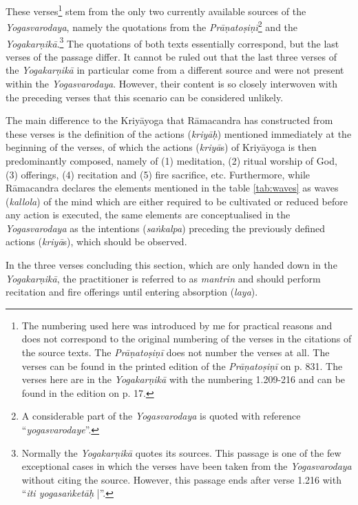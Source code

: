 These verses\footnote{The numbering used here was introduced by me for practical reasons and does not correspond to the original numbering of the verses in the citations of the source texts. The \textit{Prāṇatoṣiṇī} does not number the verses at all. The verses can be found in the printed edition of the \textit{Prāṇatoṣiṇī} on p. 831. The verses here are in the \textit{Yogakarṇikā} with the numbering 1.209-216 and can be found in the edition on p. 17.} stem from the only two currently available sources of the \textit{Yogasvarodaya}, namely the quotations from the \textit{Prāṇatoṣiṇī}\footnote{A considerable part of the \textit{Yogasvarodaya} is quoted with reference ``\textit{yogasvarodaye}''.} and the \textit{Yogakarṇikā}.\footnote{Normally the \textit{Yogakarṇikā} quotes its sources. This passage is one of the few exceptional cases in which the verses have been taken from the \textit{Yogasvarodaya} without citing the source. However, this passage ends after verse 1.216 with ``\textit{iti yogasaṅketāḥ} |''.} The quotations of both texts essentially correspond, but the last verses of the passage differ. It cannot be ruled out that the last three verses of the \textit{Yogakarṇikā} in particular come from a different source and were not present within the \textit{Yogasvarodaya}. However, their content is so closely interwoven with the preceding verses that this scenario can be considered unlikely.

The main difference to the Kriyāyoga that Rāmacandra has constructed from these verses is the definition of the actions (\textit{kriyāḥ}) mentioned immediately at the beginning of the verses, of which the actions (\textit{kriyā}s) of Kriyāyoga is then predominantly composed, namely of (1) meditation, (2) ritual worship of God, (3) offerings, (4) recitation and (5) fire sacrifice, etc. Furthermore, while Rāmacandra declares the elements mentioned in the table \ref{tab:waves} as waves (\textit{kallola}) of the mind which are either required to be cultivated or reduced before any action is executed, the same elements are conceptualised in the \textit{Yogasvarodaya} as the intentions (\textit{saṅkalpa}) preceding the previously defined actions (\textit{kriyā}s), which should be observed.

In the three verses concluding this section, which are only handed down in the \textit{Yogakarṇikā}, the practitioner is referred to as \textit{mantrin} and should perform recitation and fire offerings until entering absorption (\textit{laya}).

